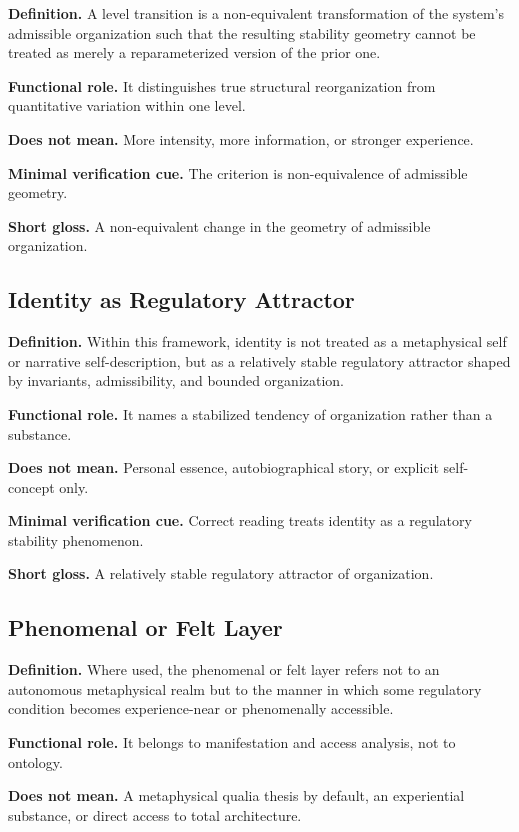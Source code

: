 \documentclass[11pt,a4paper]{article}
\begin{document}
	\textbf{Definition.} A level transition is a non-equivalent transformation of the system's admissible organization such that the resulting stability geometry cannot be treated as merely a reparameterized version of the prior one.
	
	\textbf{Functional role.} It distinguishes true structural reorganization from quantitative variation within one level.
	
	\textbf{Does not mean.} More intensity, more information, or stronger experience.
	
	\textbf{Minimal verification cue.} The criterion is non-equivalence of admissible geometry.
	
	\textbf{Short gloss.} A non-equivalent change in the geometry of admissible organization.
	
	\subsection{Identity as Regulatory Attractor}
	
	\textbf{Definition.} Within this framework, identity is not treated as a metaphysical self or narrative self-description, but as a relatively stable regulatory attractor shaped by invariants, admissibility, and bounded organization.
	
	\textbf{Functional role.} It names a stabilized tendency of organization rather than a substance.
	
	\textbf{Does not mean.} Personal essence, autobiographical story, or explicit self-concept only.
	
	\textbf{Minimal verification cue.} Correct reading treats identity as a regulatory stability phenomenon.
	
	\textbf{Short gloss.} A relatively stable regulatory attractor of organization.
	
	\subsection{Phenomenal or Felt Layer}
	
	\textbf{Definition.} Where used, the phenomenal or felt layer refers not to an autonomous metaphysical realm but to the manner in which some regulatory condition becomes experience-near or phenomenally accessible.
	
	\textbf{Functional role.} It belongs to manifestation and access analysis, not to ontology.
	
	\textbf{Does not mean.} A metaphysical qualia thesis by default, an experiential substance, or direct access to total architecture.
	
\end{document}
